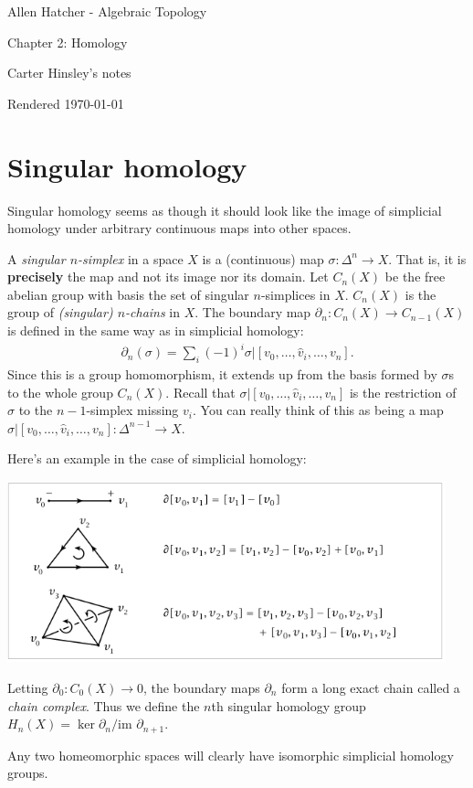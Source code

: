 \documentclass[a4paper]{article}
\begin{document}
\begin{center}
\LARGE{Allen Hatcher - Algebraic Topology}

\Large{Chapter 2: Homology}

\large{Carter Hinsley's notes}

Rendered \today
\end{center}

\section{Singular homology}

Singular homology seems as though it should look like the image of simplicial homology under arbitrary continuous maps into other spaces.

A \emph{singular $n$-simplex} in a space $X$ is a (continuous) map $\sigma : \Delta^n \to X$. That is, it is \textbf{precisely} the map and not its image nor its domain. Let $C_n(X)$ be the free abelian group with basis the set of singular $n$-simplices in $X$. $C_n(X)$ is the group of \emph{(singular) $n$-chains} in $X$. The boundary map $\partial_n : C_n(X) \to C_{n-1}(X)$ is defined in the same way as in simplicial homology:
\begin{align}
    \partial_n(\sigma) = \sum_i (-1)^i \sigma | [v_0, \ldots, \hat{v}_i, \ldots, v_n].
\end{align}
Since this is a group homomorphism, it extends up from the basis formed by $\sigma$s to the whole group $C_n(X)$. Recall that $\sigma|[v_0, \ldots, \hat{v}_i, \ldots, v_n]$ is the restriction of $\sigma$ to the $n-1$-simplex missing $v_i$. You can really think of this as being a map $\sigma|[v_0, \ldots, \hat{v}_i, \ldots, v_n] : \Delta^{n-1} \to X$.

Here's an example in the case of simplicial homology:
\begin{center}
\includegraphics[width=5in]{Hatcher - Algebraic Topology/graphics/simplicial_boundaries.png}
\end{center}

Letting $\partial_0 : C_0(X) \to 0$, the boundary maps $\partial_n$ form a long exact chain called a \emph{chain complex}. Thus we define the $n$th singular homology group $H_n(X) = \ker \partial_n / \text{im } \partial_{n+1}$.

Any two homeomorphic spaces will clearly have isomorphic simplicial homology groups.
\end{document}
